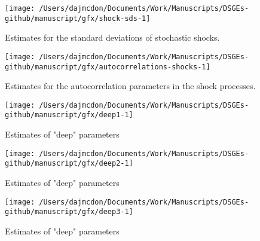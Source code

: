 \documentclass[11pt]{article}
\begin{document}
\begin{figure}[t]

{\centering \texttt{[image: /Users/dajmcdon/Documents/Work/Manuscripts/DSGEs-github/manuscript/gfx/shock-sds-1]} 

}

\caption{Estimates for the standard deviations of stochastic shocks.}\label{fig:shock-sds}
\end{figure}

\begin{figure}[t]

{\centering \texttt{[image: /Users/dajmcdon/Documents/Work/Manuscripts/DSGEs-github/manuscript/gfx/autocorrelations-shocks-1]} 

}

\caption{Estimates for the autocorrelation parameters in the shock processes.}\label{fig:autocorrelations-shocks}
\end{figure}

\begin{figure}[t]

{\centering \texttt{[image: /Users/dajmcdon/Documents/Work/Manuscripts/DSGEs-github/manuscript/gfx/deep1-1]} 

}

\caption{Estimates of "deep" parameters}\label{fig:deep1}
\end{figure}

\begin{figure}[t]

{\centering \texttt{[image: /Users/dajmcdon/Documents/Work/Manuscripts/DSGEs-github/manuscript/gfx/deep2-1]} 

}

\caption{Estimates of "deep" parameters}\label{fig:deep2}
\end{figure}

\begin{figure}[t]

{\centering \texttt{[image: /Users/dajmcdon/Documents/Work/Manuscripts/DSGEs-github/manuscript/gfx/deep3-1]} 

}

\caption{Estimates of "deep" parameters}\label{fig:deep3}
\end{figure}
\end{document}
